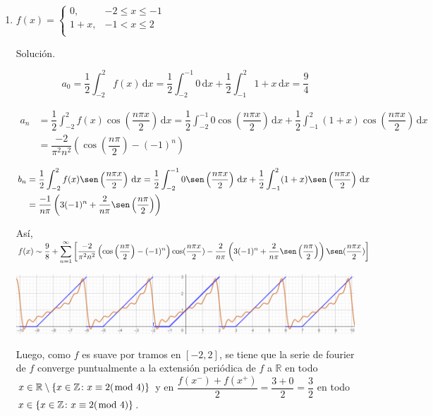 \documentclass[fleqn]{article}
\newcommand{\real}{\mathbb{R}}
\newcommand{\ent}{\mathbb{Z}}
\newcommand{\intg}[3]{\int_{#1}^{#2} #3 \, \mathrm{d}x}
\begin{document}
\begin{enumerate}[I.]
\begin{enumerate}[(1)]
			\bfseries
			\item $ f(x) = \begin{cases}
				0, & -2 \leq x \leq -1 \\
				1 + x, & -1 < x \leq 2 \\
			\end{cases} $
			
			Solución.

			\normalfont

			\begin{equation*}
				a_0 = \dfrac{1}{2} \intg{-2}{2}{f(x)} = \dfrac{1}{2} \intg{-2}{-1}{0} + \dfrac{1}{2} \intg{-1}{2}{1 + x} = \dfrac{9}{4}
			\end{equation*}

			\begin{align*}
				a_n &= \dfrac{1}{2} \intg{-2}{2}{f(x) \cos \left( \dfrac{n \pi x}{2} \right)} = \dfrac{1}{2} \intg{-2}{-1}{0 \cos \left( \dfrac{n \pi x}{2} \right)} + \dfrac{1}{2} \intg{-1}{2}{(1 + x) \cos \left( \dfrac{n \pi x}{2} \right)} \\
				&= \dfrac{-2}{\pi^2 n^2} \left( \cos \left( \dfrac{n \pi}{2} \right) - (-1)^n \right)
			\end{align*}

			\begin{align*}
				b_n &= \dfrac{1}{2} \intg{-2}{2}{f(x) \sen \left( \dfrac{n \pi x}{2} \right)} = \dfrac{1}{2} \intg{-2}{-1}{0 \sen \left( \dfrac{n \pi x}{2} \right)} + \dfrac{1}{2} \intg{-1}{2}{(1 + x) \sen \left( \dfrac{n \pi x}{2} \right)} \\
				&= \dfrac{-1}{n \pi} \left( 3(-1)^n + \dfrac{2}{n \pi} \sen \left( \dfrac{n \pi}{2} \right) \right)
			\end{align*}

			Así, $ \displaystyle f(x) \sim \dfrac{9}{8} + \sum_{n=1}^{\infty} \left[ \dfrac{-2}{\pi^2 n^2} \left( \cos \left( \dfrac{n \pi}{2} \right) - (-1)^n \right) \cos (\dfrac{n \pi x}{2}) - \dfrac{2}{n \pi} \left( 3(-1)^n + \dfrac{2}{n \pi} \sen \left( \dfrac{n \pi}{2} \right) \right) \sen (\dfrac{n \pi x}{2}) \right] $

			\includegraphics[width=\linewidth]{Ejer5.png}

			Luego, como $f$ es suave por tramos en $ [-2,2] $, se tiene que la serie de fourier de $f$ converge puntualmente a la extensión periódica de $f$ a $ \real $ en todo $ x \in \real \setminus \{ x \in \ent \colon x \equiv 2 (\hspace{-2mm} \mod 4) \} $ y en $ \dfrac{f(x^-) + f(x^+)}{2} = \dfrac{3+0}{2} = \dfrac{3}{2} $ en todo $ x \in \{ x \in \ent \colon x \equiv 2 (\hspace{-2mm} \mod 4) \} $.


\end{enumerate}
\end{enumerate}
\end{document}
